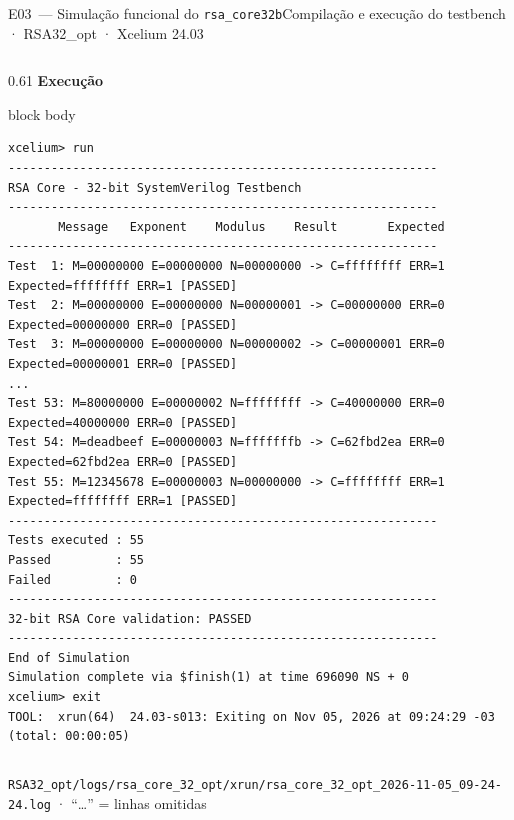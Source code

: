 \documentclass[aspectratio=169,10pt,t]{beamer}
\begin{document}
\begin{frame}[fragile]{E03~— Simulação funcional do \texttt{rsa\_core32b}}{Compilação e execução do testbench · RSA32\_opt · Xcelium 24.03}
\begin{columns}[T]
\begin{column}{0.61\textwidth}
      {\scriptsize\textbf{\color{tmCafe}Execução}}\\[0.05cm]
      \tiny
      \begin{beamercolorbox}[rounded=true,shadow=false,sep=3pt]{block body}
\vspace*{-0.6\baselineskip}
\fontsize{4.7}{5.5}\selectfont
\begin{verbatim}
xcelium> run
------------------------------------------------------------
RSA Core - 32-bit SystemVerilog Testbench
------------------------------------------------------------
       Message   Exponent    Modulus    Result       Expected
------------------------------------------------------------
Test  1: M=00000000 E=00000000 N=00000000 -> C=ffffffff ERR=1  Expected=ffffffff ERR=1 [PASSED]
Test  2: M=00000000 E=00000000 N=00000001 -> C=00000000 ERR=0  Expected=00000000 ERR=0 [PASSED]
Test  3: M=00000000 E=00000000 N=00000002 -> C=00000001 ERR=0  Expected=00000001 ERR=0 [PASSED]
...
Test 53: M=80000000 E=00000002 N=ffffffff -> C=40000000 ERR=0  Expected=40000000 ERR=0 [PASSED]
Test 54: M=deadbeef E=00000003 N=fffffffb -> C=62fbd2ea ERR=0  Expected=62fbd2ea ERR=0 [PASSED]
Test 55: M=12345678 E=00000003 N=00000000 -> C=ffffffff ERR=1  Expected=ffffffff ERR=1 [PASSED]
------------------------------------------------------------
Tests executed : 55
Passed         : 55
Failed         : 0
------------------------------------------------------------
32-bit RSA Core validation: PASSED
------------------------------------------------------------
End of Simulation
Simulation complete via $finish(1) at time 696090 NS + 0
xcelium> exit
TOOL:  xrun(64)  24.03-s013: Exiting on Nov 05, 2026 at 09:24:29 -03  (total: 00:00:05)
\end{verbatim}
\vspace*{-0.6\baselineskip}
      \end{beamercolorbox}
    \end{column}
  \end{columns}
  \vspace{0.05cm}
  {\tiny \texttt{RSA32\_opt/logs/rsa\_core\_32\_opt/xrun/rsa\_core\_32\_opt\_2026-11-05\_09-24-24.log} · ``\dots'' = linhas omitidas}
\end{frame}
\end{document}
